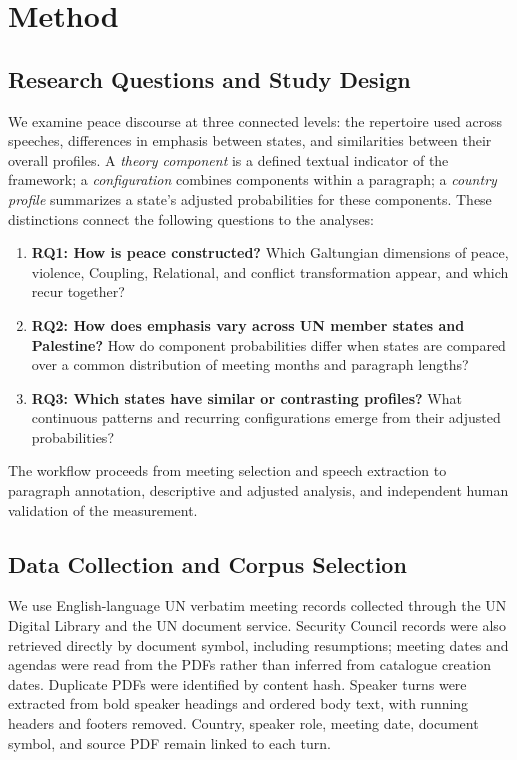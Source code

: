 \documentclass[sigconf,review,anonymous,balance=false]{acmart}
\begin{document}
\section{Method}
\subsection{Research Questions and Study Design}
We examine peace discourse at three connected levels: the repertoire used
across speeches, differences in emphasis between states, and similarities
between their overall profiles. A \emph{theory component} is a defined textual
indicator of the framework; a \emph{configuration} combines components within
a paragraph; a \emph{country profile} summarizes a state's adjusted
probabilities for these components.
These distinctions connect the following questions to the analyses:
\begin{enumerate}
  \item \textbf{RQ1: How is peace constructed?} Which Galtungian dimensions
  of peace, violence, Coupling, Relational, and conflict transformation
  appear, and which recur together?
  \item \textbf{RQ2: How does emphasis vary across UN member states and Palestine?} How do
  component probabilities differ when states are compared over a common
  distribution of meeting months and paragraph lengths?
  \item \textbf{RQ3: Which states have similar or contrasting profiles?}
  What continuous patterns and recurring configurations emerge from
  their adjusted probabilities?
\end{enumerate}
The workflow proceeds from meeting selection and speech extraction to
paragraph annotation, descriptive and adjusted analysis, and independent
human validation of the measurement.

\subsection{Data Collection and Corpus Selection}
We use English-language UN verbatim meeting records collected through the
UN Digital Library and the UN document service. Security Council records
were also retrieved directly by document symbol, including resumptions;
meeting dates and agendas were read from the PDFs rather than inferred
from catalogue creation dates. Duplicate PDFs were identified by content
hash. Speaker turns were extracted from bold speaker headings and ordered
body text, with running headers and footers removed. Country, speaker role,
meeting date, document symbol, and source PDF remain linked to each turn.
\end{document}
